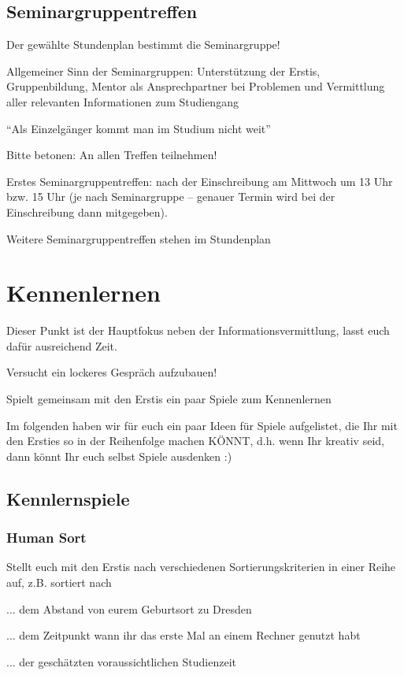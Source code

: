 \documentclass[a4paper,12pt]{report}
\begin{document}
\subsection{Seminargruppentreffen}
\begin{itemize*}
	\item Der gewählte Stundenplan bestimmt die Seminargruppe!
	\item Allgemeiner Sinn der Seminargruppen: Unterstützung der Erstis, Gruppenbildung, Mentor als Ansprechpartner bei Problemen und Vermittlung aller relevanten Informationen zum Studiengang
	\item \enquote{Als Einzelgänger kommt man im Studium nicht weit}
	\item Bitte betonen: An allen Treffen teilnehmen!
	\item Erstes Seminargruppentreffen: nach der Einschreibung am Mittwoch um 13 Uhr bzw. 15 Uhr (je nach Seminargruppe -- genauer Termin wird bei der Einschreibung dann mitgegeben).
	\item Weitere Seminargruppentreffen stehen im Stundenplan
\end{itemize*}


\section{Kennenlernen}
\begin{itemize*}
	\item Dieser Punkt ist der Hauptfokus neben der Informationsvermittlung, lasst euch dafür ausreichend Zeit.
	\item Versucht ein lockeres Gespräch aufzubauen!
	\item Spielt gemeinsam mit den Erstis ein paar Spiele zum Kennenlernen 
	\item Im folgenden haben wir für euch ein paar Ideen für Spiele aufgelistet, die Ihr mit den Ersties so in der Reihenfolge machen KÖNNT, d.h. wenn Ihr kreativ seid, dann könnt Ihr euch selbst Spiele ausdenken :)
\end{itemize*}


\subsection{Kennlernspiele}

\subsubsection{Human Sort} 
\begin{itemize*} 
	\item Stellt euch mit den Erstis nach verschiedenen Sortierungskriterien in einer Reihe auf, z.B. sortiert nach
	\item ... dem Abstand von eurem Geburtsort zu Dresden 
	\item ... dem Zeitpunkt wann ihr das erste Mal an einem Rechner genutzt habt
	\item ... der geschätzten voraussichtlichen Studienzeit 
\end{itemize*} 
\end{document}
